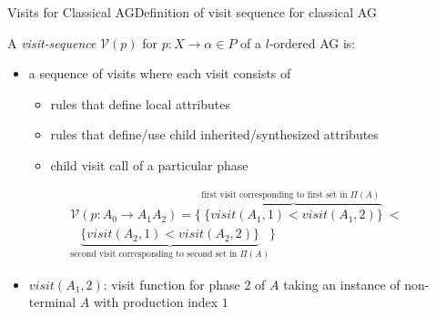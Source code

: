 \begin{frame}{Visits for Classical AG}{Definition of visit sequence for classical AG}

A \emph{visit-sequence} $\mathscr{V}(p)$ for $p{:} X \rightarrow \alpha \in P$ of a $l$-ordered AG is:

\begin{itemize}
    \item a sequence of visits where each visit consists of
    \begin{itemize}
        \item rules that define local attributes
        \item rules that define/use child inherited/synthesized attributes 
        \item child visit call of a particular phase
    \end{itemize}
\end{itemize}


{
\scriptsize
\begin{equation}\label{eq:visit-for-production-aa}
\begin{gathered}
\mathscr{V}(p{:} A_0 \rightarrow A_1 A_2) = \Bigg\{               
   \overbrace{ \Big\{  \mathit{visit}(A_1, 1)  < \mathit{visit}(A_1, 2)	 \Big\}}^\text{first visit corresponding to first set in $\Pi(A)$ }  <  \\
   \underbrace{ \Big\{  \mathit{visit}(A_2, 1)  < \mathit{visit}(A_2, 2) \Big\}}_\text{second visit corresponding to second set in $\Pi(A)$}
\Bigg\}
\end{gathered}
\end{equation}
}

\begin{itemize}
    \item[] {\huge \bell}  $\mathit{visit}(A_1, 2)$: visit function for phase 2 of $A$ taking an instance of non-terminal $A$ with production index $1$
\end{itemize}
\end{frame}



